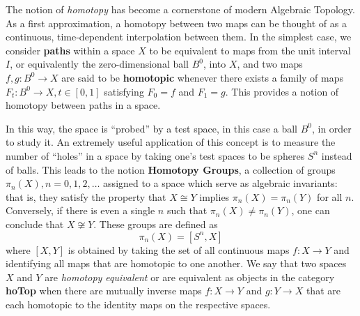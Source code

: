 \documentclass[a0,final]{a0poster}
\begin{document}
\begin{multicols}{3}
The notion of \textit{homotopy} has become a cornerstone of modern Algebraic Topology. As a first approximation, a homotopy between two maps can be thought of as a continuous, time-dependent interpolation between them. In the simplest case, we consider \textbf{paths} within a space $X$ to be equivalent to maps from the unit interval $I$, or equivalently the zero-dimensional ball $B^0$, into $X$, and two maps $f, g: B^0 \to X$ are said to be \textbf{homotopic} whenever there exists a family of maps $F_t: B^0 \to X, t \in [0, 1]$ satisfying $F_0 = f$ and $F_1 = g$. This provides a notion of homotopy between paths in a space.

In this way, the space is ``probed'' by a test space, in this case a ball $B^0$, in order to study it. An extremely useful application of this concept is to measure the number of ``holes'' in a space by taking one's test spaces to be spheres $S^n$ instead of balls. This leads to the notion \textbf{Homotopy Groups}, a collection of groups $\pi_n(X), n = 0, 1, 2, \ldots$ assigned to a space which serve as algebraic invariants: that is, they satisfy the property that $X \cong Y$ implies $\pi_n(X) = \pi_n(Y)$ for all $n$. Conversely, if there is even a single $n$ such that $\pi_n(X) \neq \pi_n(Y)$, one can conclude that $X \not \cong Y$. These groups are defined as 
$$\pi_n(X) = [S^n, X]$$
where $[X, Y]$ is obtained by taking the set of all continuous maps $f: X \to Y$ and identifying all maps that are homotopic to one another. We say that two spaces $X$ and $Y$ are \textit{homotopy equivalent} or are equivalent as objects in the category \textbf{hoTop} when there are mutually inverse maps $f: X \to Y$ and $g: Y \to X$ that are each homotopic to the identity maps on the respective spaces.

\begin{center}



\end{center}
\end{multicols}
\end{document}
